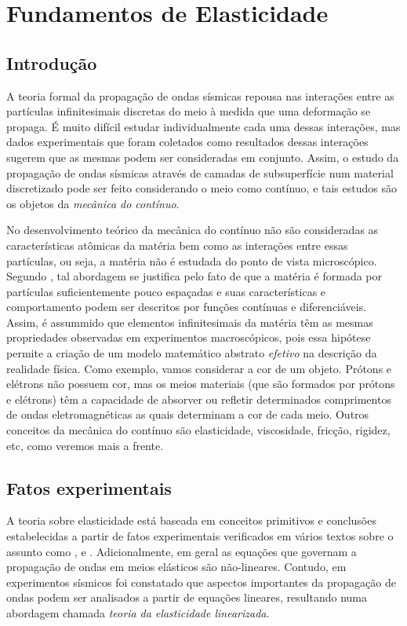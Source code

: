 \chapter{Fundamentos de Elasticidade}\label{sec.fund_elast}

\section{Introdu\c{c}\~ao}
A teoria formal da propaga\c{c}\~ao de ondas s\'ismicas repousa nas intera\c{c}\~oes entre as part\'iculas infinitesimais discretas do meio \`a medida que uma deforma\c{c}\~ao se propaga. \'E muito dif\'icil estudar individualmente cada uma dessas intera\c{c}\~oes, mas dados experimentais que foram coletados como resultados dessas intera\c{c}\~oes sugerem que as mesmas podem ser consideradas em conjunto. Assim, o estudo da propaga\c{c}\~ao de ondas s\'ismicas atrav\'es de camadas de subsuperf\'icie num material discretizado pode ser feito considerando o meio como cont\'inuo, e tais estudos s\~ao os objetos da \textit{mec\^anica do cont\'inuo}. 

No desenvolvimento te\'orico da mec\^anica do cont\'inuo n\~ao s\~ao consideradas as caracter\'isticas at\^omicas da mat\'eria bem como as intera\c{c}\~oes entre essas part\'iculas, ou seja, a mat\'eria n\~ao \'e estudada do ponto de vista microsc\'opico. Segundo \cite{slawinski}, tal abordagem se justifica pelo fato de que a mat\'eria \'e formada por part\'iculas suficientemente pouco espa\c{c}adas e suas caracter\'isticas e comportamento podem ser descritos por fun\c{c}\~oes cont\'inuas e diferenci\'aveis. Assim, \'e assummido que elementos infinitesimais da mat\'eria t\^em as mesmas propriedades observadas em experimentos macrosc\'opicos, pois essa hip\'otese permite a cria\c{c}\~ao de um modelo matem\'atico abstrato \textit{efetivo} na descri\c{c}\~ao da realidade f\'isica. Como exemplo, vamos considerar a cor de um objeto. Pr\'otons e el\'etrons n\~ao possuem cor, mas os meios materiais (que s\~ao formados por pr\'otons e el\'etrons) t\^em a capacidade de absorver ou refletir determinados comprimentos de ondas eletromagn\'eticas as quais determinam a cor de cada meio. Outros conceitos da mec\^anica do cont\'inuo s\~ao elasticidade, viscosidade, fric\c{c}\~ao, rigidez, etc, como veremos mais a frente.


\section{Fatos experimentais}
A teoria sobre elasticidade est\'a baseada em conceitos primitivos e conclus\~oes estabelecidas a partir de fatos experimentais verificados em v\'arios textos sobre o assunto como \cite{liu}, \cite{dahlem} e \cite{slawinski}. Adicionalmente, em geral as equa\c{c}\~oes que governam a propaga\c{c}\~ao de ondas em meios el\'asticos s\~ao n\~ao-lineares. Contudo, em experimentos s\'ismicos foi constatado que aspectos importantes da propaga\c{c}\~ao de ondas podem ser analisados a partir de equa\c{c}\~oes lineares, resultando numa abordagem chamada \textit{teoria da elasticidade linearizada}.

